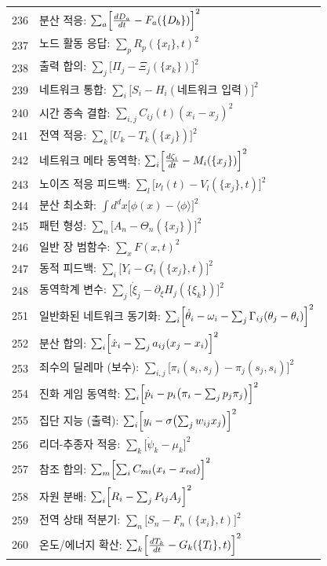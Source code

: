 \documentclass[11pt,a4paper]{article}
\begin{document}
\begin{longtable}{r l}
		236 & 분산 적응: $\sum_a\Bigl[\frac{dD_a}{dt} - F_a(\{D_b\})\Bigr]^2$ \\
		237 & 노드 활동 응답: $\sum_p R_p(\{x_l\},t)^2$ \\
		238 & 출력 합의: $\sum_j\bigl[\Pi_j - \Xi_j(\{x_k\})\bigr]^2$ \\
		239 & 네트워크 통합: $\sum_i\bigl[S_i - H_i(\text{네트워크 입력})\bigr]^2$ \\
		240 & 시간 종속 결합: $\sum_{i,j}C_{ij}(t)(x_i - x_j)^2$ \\
		241 & 전역 적응: $\sum_k\bigl[U_k - T_k(\{x_j\})\bigr]^2$ \\
		242 & 네트워크 메타 동역학: $\sum_i\Bigl[\frac{d\zeta_i}{dt} - M_i(\{x_j\})\Bigr]^2$ \\
		243 & 노이즈 적응 피드백: $\sum_l\bigl[\nu_l(t) - V_l(\{x_j\},t)\bigr]^2$ \\
		244 & 분산 최소화: $\int d^dx\bigl[\phi(x) - \langle\phi\rangle\bigr]^2$ \\
		245 & 패턴 형성: $\sum_n\bigl[A_n - \Theta_n(\{x_j\})\bigr]^2$ \\
		246 & 일반 장 범함수: $\sum_x F(x,t)^2$ \\
		247 & 동적 피드백: $\sum_i\bigl[Y_i - G_i(\{x_j\},t)\bigr]^2$ \\
		248 & 동역학계 변수: $\sum_j\bigl[\dot\xi_j - \partial_\xi H_j(\{\xi_k\})\bigr]^2$ \\
		251 & 일반화된 네트워크 동기화: $\sum_i\Bigl[\dot\theta_i - \omega_i - \sum_j\Gamma_{ij}(\theta_j-\theta_i)\Bigr]^2$ \\
		252 & 분산 합의: $\sum_i\Bigl[\dot x_i - \sum_j a_{ij}(x_j-x_i)\Bigr]^2$ \\
		253 & 죄수의 딜레마 (보수): $\sum_{i,j}\bigl[\pi_i(s_i,s_j) - \pi_j(s_j,s_i)\bigr]^2$ \\
		254 & 진화 게임 동역학: $\sum_i\Bigl[\dot p_i - p_i\bigl(\pi_i - \sum_j p_j\pi_j\bigr)\Bigr]^2$ \\
		255 & 집단 지능 (출력): $\sum_i\Bigl[y_i - \sigma\bigl(\sum_j w_{ij}x_j\bigr)\Bigr]^2$ \\
		256 & 리더-추종자 적응: $\sum_k\bigl[\dot\psi_k - \mu_k\bigr]^2$ \\
		257 & 참조 합의: $\sum_m\Bigl[\sum_i C_{mi}(x_i-x_{\text{ref}})\Bigr]^2$ \\
		258 & 자원 분배: $\sum_i\Bigl[R_i - \sum_j P_{ij}A_j\Bigr]^2$ \\
		259 & 전역 상태 적분기: $\sum_n\bigl[S_n - F_n(\{x_i\},t)\bigr]^2$ \\
		260 & 온도/에너지 확산: $\sum_k\Bigl[\frac{dT_k}{dt} - G_k(\{T_l\},t)\Bigr]^2$ \\

\end{longtable}
\end{document}
